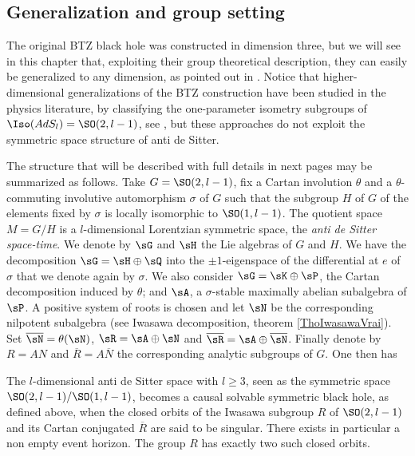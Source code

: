 \subsection{Generalization and group setting}
\label{SubSecGEneBHGrop}


The original BTZ black hole was constructed in dimension three, but we will see in this chapter that, exploiting their group theoretical description, they can easily be generalized to any dimension, as pointed out in \cite{BDRS,lcTNAdS}.  Notice that higher-dimensional generalizations of the BTZ construction have been studied in the physics literature, by classifying the one-parameter isometry subgroups of $\Iso(AdS_l)=\SO(2,l-1)$, see \cite{Figueroa,AdSBH,Madden,BanadosIQxXuEh,Aminneborg,HolstPeldan}, but these approaches do not exploit the symmetric space structure of anti de Sitter.

The structure that will be described with full details in next pages may be summarized as follows. Take $G=\SO(2,l-1)$, fix a Cartan involution $\theta$ and a $\theta$-commuting involutive automorphism $\sigma$ of $G$ such that the subgroup $H$ of $G$ of the elements fixed by $\sigma$ is locally isomorphic to $\SO(1,l-1)$. The quotient space $M=G/H$ is a $l$-dimensional Lorentzian symmetric space, the {\sl anti de Sitter space-time}.  We denote by $\sG$ and $\sH$ the Lie algebras of $G$ and $H$. We have the decomposition $\sG=\sH\oplus\sQ$ into the $\pm 1$-eigenspace  of the differential at $e$ of $\sigma$ that we denote again by $\sigma$.  We also consider $\sG=\sK\oplus\sP$, the Cartan decomposition induced by $\theta$; and $\sA$, a $\sigma$-stable maximally abelian subalgebra of $\sP$. A positive system of roots is chosen  and let $\sN$ be the corresponding nilpotent subalgebra (see Iwasawa decomposition, theorem \ref{ThoIwasawaVrai}).  Set  $\overline{\sN}=\theta(\sN)$, $\sR=\sA\oplus\sN$ and $\overline{\sR}=\sA\oplus\overline{\sN}$. Finally denote by $R=AN$ and $\overline{R}=A\overline{N}$ the corresponding analytic subgroups of $G$.  One then has

\begin{theorem}
The $l$-dimensional anti de Sitter space with $l\geq 3$, seen as the symmetric space $\SO(2,l-1)/\SO(1,l-1)$, becomes a causal solvable symmetric black hole, as defined above, when the closed orbits of the Iwasawa subgroup $R$ of $\SO(2,l-1)$ and its Cartan conjugated $\overline{ R }$ are said to be singular. There exists in particular a non empty event horizon. The group $R$ has exactly two such closed orbits. 
\label{ThoLeBut}
 \end{theorem}

